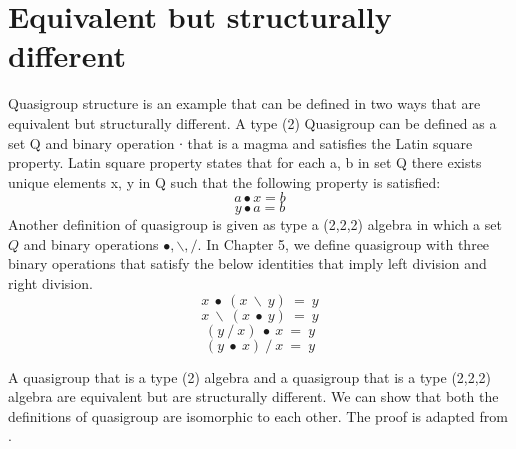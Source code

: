 \section{Equivalent but structurally different}
Quasigroup structure is an example that can be defined in two ways that are
equivalent but structurally different. A type (2) Quasigroup can be defined as a
set Q and binary operation ∙ that is a magma and satisfies the Latin square
property. Latin square property states that for each a, b in set Q there exists
unique elements x, y in Q such that the following property is satisfied:
\begin{equation}
a ∙ x = b
\end{equation}
\begin{equation}
y ∙ a = b
\end{equation}
Another definition of quasigroup is given as type a (2,2,2) algebra in which a
set $Q$ and binary operations $∙, \backslash, /$. In Chapter 5, we define
quasigroup with three binary operations that satisfy the below identities that
imply left division and right division. 
\begin{equation} \label{eq_L-leftdivides}
  x\ ∙\ (x\ \backslash\ y) \ = \ y
\end{equation}
\begin{equation} \label{eq_L-rightdivides}
  x\ \backslash\ (x\ ∙\ y)\ = \ y
\end{equation}
\begin{equation} \label{eq_R-leftdivides}
  (y\ /\ x)\ ∙\ x \ =\ y
\end{equation}
\begin{equation} \label{eq_Rirightdivides}
  (y\ ∙\ x)\ /\ x \ =\ y
\end{equation}

A quasigroup that is a type (2) algebra and a quasigroup that is a type (2,2,2)
algebra are equivalent but are structurally different. We can show that both the
definitions of quasigroup are isomorphic to each other. The proof is adapted
from \cite{shcherbacov2003elements}.

